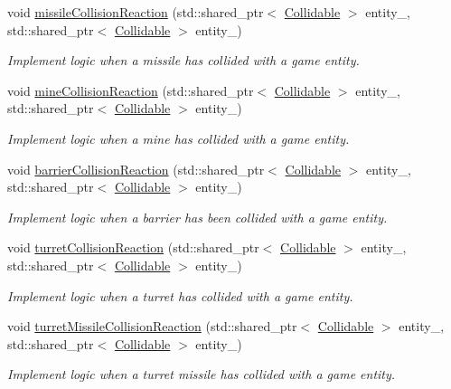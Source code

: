 \begin{DoxyCompactItemize}
void \hyperlink{classCollisionManager_a24cc244fbd482cb7de2585878fee2c89}{missile\-Collision\-Reaction} (std\-::shared\-\_\-ptr$<$ \hyperlink{classCollidable}{Collidable} $>$ entity\-\_, std\-::shared\-\_\-ptr$<$ \hyperlink{classCollidable}{Collidable} $>$ entity\-\_)
\begin{DoxyCompactList}\small\item\em Implement logic when a missile has collided with a game entity. \end{DoxyCompactList}\item 
void \hyperlink{classCollisionManager_ad94c2efb613059b9fc66c00b1947e7de}{mine\-Collision\-Reaction} (std\-::shared\-\_\-ptr$<$ \hyperlink{classCollidable}{Collidable} $>$ entity\-\_, std\-::shared\-\_\-ptr$<$ \hyperlink{classCollidable}{Collidable} $>$ entity\-\_)
\begin{DoxyCompactList}\small\item\em Implement logic when a mine has collided with a game entity. \end{DoxyCompactList}\item 
void \hyperlink{classCollisionManager_aa06b6597bf3b4636b55e4bad6a641de2}{barrier\-Collision\-Reaction} (std\-::shared\-\_\-ptr$<$ \hyperlink{classCollidable}{Collidable} $>$ entity\-\_, std\-::shared\-\_\-ptr$<$ \hyperlink{classCollidable}{Collidable} $>$ entity\-\_)
\begin{DoxyCompactList}\small\item\em Implement logic when a barrier has been collided with a game entity. \end{DoxyCompactList}\item 
void \hyperlink{classCollisionManager_ad175a3730f4c984adae73814706417de}{turret\-Collision\-Reaction} (std\-::shared\-\_\-ptr$<$ \hyperlink{classCollidable}{Collidable} $>$ entity\-\_, std\-::shared\-\_\-ptr$<$ \hyperlink{classCollidable}{Collidable} $>$ entity\-\_)
\begin{DoxyCompactList}\small\item\em Implement logic when a turret has collided with a game entity. \end{DoxyCompactList}\item 
void \hyperlink{classCollisionManager_a06e15e9c05a1ae1742a71e6b8b72629a}{turret\-Missile\-Collision\-Reaction} (std\-::shared\-\_\-ptr$<$ \hyperlink{classCollidable}{Collidable} $>$ entity\-\_, std\-::shared\-\_\-ptr$<$ \hyperlink{classCollidable}{Collidable} $>$ entity\-\_)
\begin{DoxyCompactList}\small\item\em Implement logic when a turret missile has collided with a game entity. \end{DoxyCompactList}\item 

\end{DoxyCompactItemize}
